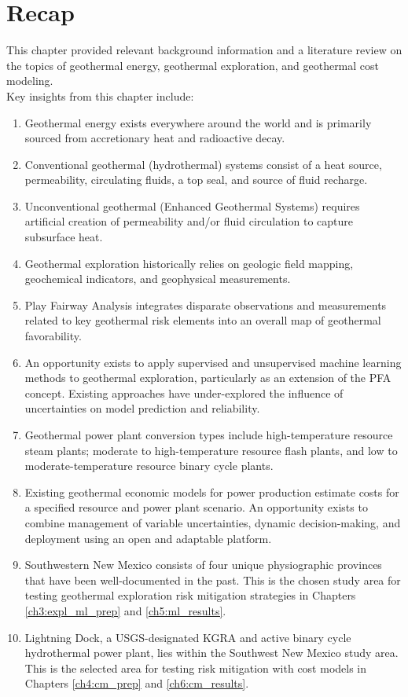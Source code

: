 \section{Recap}\label{ch2:recap}
This chapter provided relevant background information and a literature review on the topics of geothermal energy, geothermal exploration, and geothermal cost modeling.
\\
Key insights from this chapter include:
\begin{enumerate}
    \item Geothermal energy exists everywhere around the world and is primarily sourced from accretionary heat and radioactive decay.
    \item Conventional geothermal (hydrothermal) systems consist of a heat source, permeability, circulating fluids, a top seal, and source of fluid recharge.
    \item Unconventional geothermal (Enhanced Geothermal Systems) requires artificial creation of permeability and/or fluid circulation to capture subsurface heat.
    \item Geothermal exploration historically relies on geologic field mapping, geochemical indicators, and geophysical measurements.
    \item Play Fairway Analysis integrates disparate observations and measurements related to key geothermal risk elements into an overall map of geothermal favorability.
    \item An opportunity exists to apply supervised and unsupervised machine learning methods to geothermal exploration, particularly as an extension of the PFA concept. Existing approaches have under-explored the influence of uncertainties on model prediction and reliability.
    \item Geothermal power plant conversion types include high-temperature resource steam plants; moderate to high-temperature resource flash plants, and low to moderate-temperature resource binary cycle plants. 
    \item Existing geothermal economic models for power production estimate costs for a specified resource and power plant scenario. An opportunity exists to combine management of variable uncertainties, dynamic decision-making, and deployment using an open and adaptable platform.
    \item Southwestern New Mexico consists of four unique physiographic provinces that have been well-documented in the past. This is the chosen study area for testing geothermal exploration risk mitigation strategies in Chapters \ref{ch3:expl_ml_prep} and \ref{ch5:ml_results}.
    \item Lightning Dock, a USGS-designated KGRA and active binary cycle hydrothermal power plant, lies within the Southwest New Mexico study area. This is the selected area for testing risk mitigation with cost models in Chapters \ref{ch4:cm_prep} and \ref{ch6:cm_results}.
\end{enumerate}